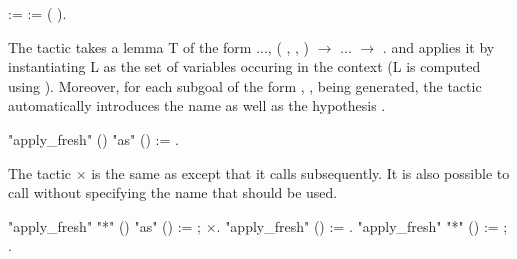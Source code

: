 \documentclass[12pt]{report}
\begin{document}
\begin{coqdoccode}
\coqdocemptyline
\coqdocnoindent
{}   :=\coqdoceol
\coqdocindent{1.00em}
  :=   (  ).\coqdoceol
\coqdocemptyline
\end{coqdoccode}
The tactic     takes a lemma T of the form 
    \coqdockw{\ensuremath{\forall}}  ..., (\coqdockw{\ensuremath{\forall}} ,   ,  ) \ensuremath{\rightarrow} ... \ensuremath{\rightarrow} .
    and applies it by instantiating L as the set of variables 
    occuring in the context (L is computed using ).
    Moreover, for each subgoal of the form \coqdockw{\ensuremath{\forall}} ,   ,  
    being generated, the tactic automatically introduces the name  
    as well as the hypothesis   .
\begin{coqdoccode}
\coqdocemptyline
\coqdocnoindent
{} "apply\_fresh" () "as" () :=\coqdoceol
\coqdocindent{1.00em}
   .\coqdoceol
\coqdocemptyline
\end{coqdoccode}
The tactic \ensuremath{\times}    is the same as 
        except that it calls  
    subsequently. It is also possible to call 
    without specifying the name that should be used.
\begin{coqdoccode}
\coqdocemptyline
\coqdocnoindent
{} "apply\_fresh" "*" () "as" () :=\coqdoceol
\coqdocindent{1.00em}
   ; \ensuremath{\times}.\coqdoceol
\coqdocnoindent
{} "apply\_fresh" () :=\coqdoceol
\coqdocindent{1.00em}
   .\coqdoceol
\coqdocnoindent
{} "apply\_fresh" "*" () :=\coqdoceol
\coqdocindent{1.00em}
 ; .\coqdoceol
\coqdocemptyline
\end{coqdoccode}
\end{document}
